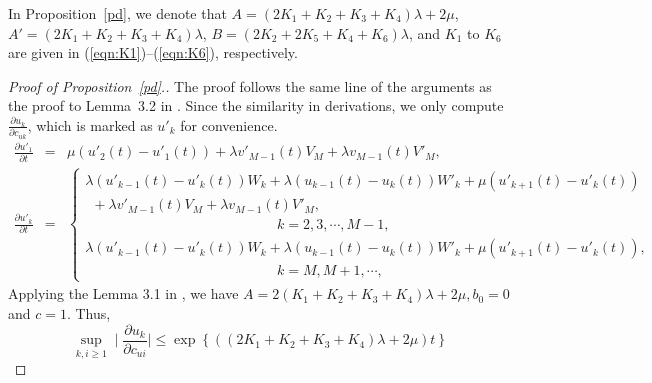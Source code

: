 \documentclass[12pt]{article}
\begin{document}
In Proposition~\ref{pd}, we denote that $A=(2K_1+K_2+K_3+K_4)\lambda+2\mu$, $A'=(2K_1+K_2+K_3+K_4)\lambda$, $B=(2K_2+2K_5+K_4+K_6)\lambda$, and $K_1$ to $K_6$ are given in (\ref{eqn:K1})--(\ref{eqn:K6}), respectively.


\begin{proof}[Proof of Proposition~\ref{pd}.]

 The proof follows the same line of the arguments as the proof to Lemma~3.2 in \cite{JB}.  Since the similarity in derivations, we only compute $\displaystyle \frac{\partial u_{k}}{\partial c_{uk}}$, which is marked as $u'_{k}$ for convenience.
\begin{eqnarray}
 \nonumber \frac{\partial u'_{1}}{\partial t} &=& \mu(u'_{2}(t)-u'_{1}(t))+\lambda v'_{M-1}(t)V_{M}+\lambda v_{M-1}(t)V'_{M}, \\
 \nonumber \frac{\partial u'_{k}}{\partial t} &=& \left\{\begin{array}{l}
                                                  \lambda (u'_{k-1}(t)-u'_{k}(t))W_{k}+\lambda (u_{k-1}(t)-u_{k}(t))W'_{k}+\mu(u'_{k+1}(t)-u'_{k}(t))\\[4mm]
                                                  ~~+\lambda v'_{M-1}(t)V_{M}+\lambda v_{M-1}(t)V'_{M},\\[4mm]
~~~~~~~~~~~~~~~~~~~~~~~~~~~~~~~~~~~~~~~~~~~~~~~~~~~~~~~~~~~~~~ k=2,3,\cdots,M-1,\\[4mm]
                                                  \lambda (u'_{k-1}(t)-u'_{k}(t))W_{k}+\lambda (u_{k-1}(t)-u_{k}(t))W'_{k}+\mu(u'_{k+1}(t)-u'_{k}(t)),\\[4mm]
 ~~~~~~~~~~~~~~~~~~~~~~~~~~~~~~~~~~~~~~~~~~~~~~~~~~~~~~~~~~~~~~  k=M,M+1,\cdots,
                                              \end{array}
                                          \right.
\end{eqnarray}
Applying the Lemma 3.1 in \cite{JB}, we have $A=2(K_1+K_2+K_3+K_4)\lambda+2\mu, b_0=0$ and $c=1$.
Thus,
\begin{equation*}
  \displaystyle\sup\limits_{k,i\geq1}\mid \frac{\partial u_{k}}{\partial c_{ui}}\mid\leq \exp \left\{((2K_1+K_2+K_3+K_4)\lambda +2\mu)t\right\}
\end{equation*}
\end{proof}


\end{document}

